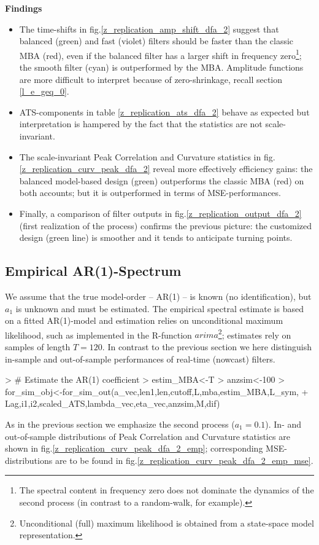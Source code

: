 \documentclass[a4paper]{book}
\begin{document}
\textbf{Findings}
\begin{itemize}
\item The time-shifts in fig.\ref{z_replication_amp_shift_dfa_2} suggest that balanced (green) and fast (violet) filters should be faster than the classic MBA (red), even if the balanced filter has a larger shift in frequency zero\footnote{The spectral content in frequency zero does not dominate the dynamics of the second process (in contrast to a random-walk, for example).}; the smooth filter (cyan) is outperformed by the MBA. Amplitude functions are more difficult to interpret because of zero-shrinkage, recall section \ref{l_e_geq_0}. 
\item ATS-components in table \ref{z_replication_ats_dfa_2} behave as expected but interpretation is hampered by the fact that the statistics are not scale-invariant.
\item The scale-invariant Peak Correlation and Curvature statistics in fig.\ref{z_replication_curv_peak_dfa_2} reveal more effectively efficiency gains: the balanced model-based design (green) outperforms the classic MBA (red) on both accounts; but it is outperformed in terms of MSE-performances.
\item Finally, a comparison of filter outputs in fig.\ref{z_replication_output_dfa_2} (first realization of the process) confirms the previous picture: the customized design (green line) is smoother and it tends to anticipate turning points.
\end{itemize}








\subsection{Empirical AR(1)-Spectrum}\label{ar1_spect}


We assume that the true model-order -- AR(1) -- is known (no identification), but $a_1$ is unknown and must be estimated. The empirical spectral estimate is based on a fitted AR(1)-model and estimation relies on unconditional maximum likelihood, such as implemented in the R-function $arima$\footnote{Unconditional (full) maximum likelihood is obtained from a state-space model representation.}; estimates rely on samples of length $T=120$. In contrast to the previous section we here distinguish in-sample and out-of-sample performances of real-time (nowcast) filters.


\begin{Schunk}
\begin{Sinput}
> # Estimate the AR(1) coefficient
> estim_MBA<-T
> anzsim<-100
> for_sim_obj<-for_sim_out(a_vec,len1,len,cutoff,L,mba,estim_MBA,L_sym,
+               Lag,i1,i2,scaled_ATS,lambda_vec,eta_vec,anzsim,M,dif)
\end{Sinput}
\end{Schunk}
As in the previous section we emphasize the second process ($a_1=0.1$). In- and out-of-sample distributions of Peak Correlation and Curvature statistics are shown in fig.\ref{z_replication_curv_peak_dfa_2_emp}; corresponding MSE-distributions are to be found in fig.\ref{z_replication_curv_peak_dfa_2_emp_mse}.
\end{document}
